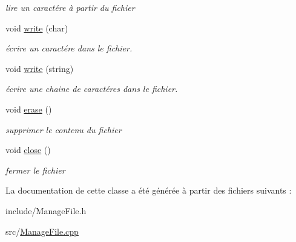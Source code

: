 \begin{DoxyCompactItemize}
\begin{DoxyCompactList}\small\item\em lire un caractére à partir du fichier \end{DoxyCompactList}\item 
void \hyperlink{class_manage_file_a70b2f89264df559b4afffb9e9ca01294}{write} (char)\hypertarget{class_manage_file_a70b2f89264df559b4afffb9e9ca01294}{}\label{class_manage_file_a70b2f89264df559b4afffb9e9ca01294}

\begin{DoxyCompactList}\small\item\em écrire un caractére dans le fichier. \end{DoxyCompactList}\item 
void \hyperlink{class_manage_file_a74d2447d683ae9d6735ce49082940eb9}{write} (string)\hypertarget{class_manage_file_a74d2447d683ae9d6735ce49082940eb9}{}\label{class_manage_file_a74d2447d683ae9d6735ce49082940eb9}

\begin{DoxyCompactList}\small\item\em écrire une chaine de caractéres dans le fichier. \end{DoxyCompactList}\item 
void \hyperlink{class_manage_file_a484495090715696f5cbda5c543f48237}{erase} ()\hypertarget{class_manage_file_a484495090715696f5cbda5c543f48237}{}\label{class_manage_file_a484495090715696f5cbda5c543f48237}

\begin{DoxyCompactList}\small\item\em supprimer le contenu du fichier \end{DoxyCompactList}\item 
void \hyperlink{class_manage_file_a8eb66054851cb3752ded544b001df4f0}{close} ()\hypertarget{class_manage_file_a8eb66054851cb3752ded544b001df4f0}{}\label{class_manage_file_a8eb66054851cb3752ded544b001df4f0}

\begin{DoxyCompactList}\small\item\em fermer le fichier \end{DoxyCompactList}\end{DoxyCompactItemize}


La documentation de cette classe a été générée à partir des fichiers suivants \+:\begin{DoxyCompactItemize}
\item 
include/Manage\+File.\+h\item 
src/\hyperlink{_manage_file_8cpp}{Manage\+File.\+cpp}\end{DoxyCompactItemize}
